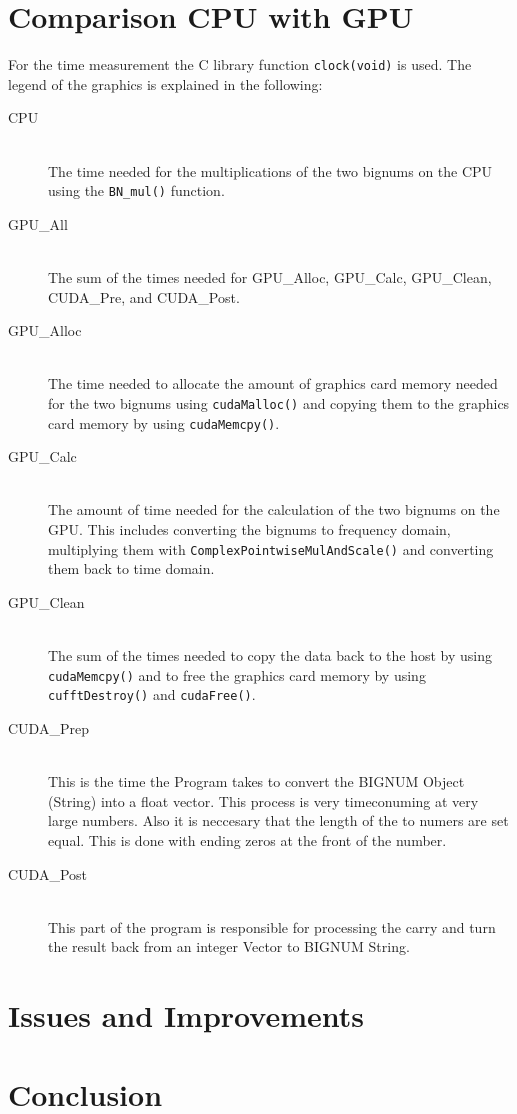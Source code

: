 \documentclass[12pt,a4paper]{article}
\begin{document}
\section{Comparison CPU with GPU}
For the time measurement the C library function \texttt{clock(void)} is used. The legend of the graphics is explained in the following:
\begin{description}
\item[CPU]\hfill \\
The time needed for the multiplications of the two bignums on the CPU using the \texttt{BN_mul()} function.
\item[GPU\_All]\hfill \\ 
The sum of the times needed for GPU\_Alloc, GPU\_Calc, GPU\_Clean, CUDA\_Pre, and CUDA\_Post.
\item[GPU\_Alloc]\hfill \\ 
The time needed to allocate the amount of graphics card memory needed for the two bignums using \texttt{cudaMalloc()} and copying them to the graphics card memory by using \texttt{cudaMemcpy()}.
\item[GPU\_Calc]\hfill \\ 
The amount of time needed for the calculation of the two bignums on the GPU. This includes converting the bignums to frequency domain, multiplying them with \texttt{ComplexPointwiseMulAndScale()} and converting them back to time domain.
\item[GPU\_Clean]\hfill \\ 
The sum of the times needed to copy the data back to the host by using \texttt{cudaMemcpy()} and to free the graphics card memory by using \texttt{cufftDestroy()} and \texttt{cudaFree()}.
\item[CUDA\_Prep]\hfill \\ 
This is the time the Program takes to convert the BIGNUM Object (String) into a float vector. This process is very timeconuming at very large numbers. Also it is neccesary that the length of the to numers are set equal. This is done with ending zeros at the front of the number.
\item[CUDA\_Post]\hfill \\ 
This part of the program is responsible for processing the carry and turn the result back from an integer Vector to BIGNUM String.


\end{description}




\section{Issues and Improvements}

\section{Conclusion}


\end{document}
